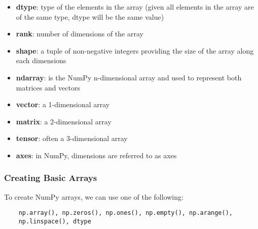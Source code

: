 \documentclass[12pt, a4paper]{article}
\begin{document}
\begin{itemize}
    \item \textbf{dtype}: type of the elements in the array (given all elements in the array are of the same type, dtype will be the same value)
    \item \textbf{rank}: number of dimensions of the array
    \item \textbf{shape}: a tuple of non-negative integers providing the size of the array along each dimensions
    \item \textbf{ndarray}: is the NumPy n-dimensional array and used to represent both matrices and vectors
    \item \textbf{vector}: a 1-dimensional array
    \item \textbf{matrix}: a 2-dimensional array
    \item \textbf{tensor}: often a 3-dimensional array
    \item \textbf{axes}: in NumPy, dimensions are referred to as axes
\end{itemize}


\subsubsection{Creating Basic Arrays}
To create NumPy arrays, we can use one of the following:  
\newline

\begin{lstlisting}
    np.array(), np.zeros(), np.ones(), np.empty(), np.arange(), 
    np.linspace(), dtype
\end{lstlisting}
\end{document}
